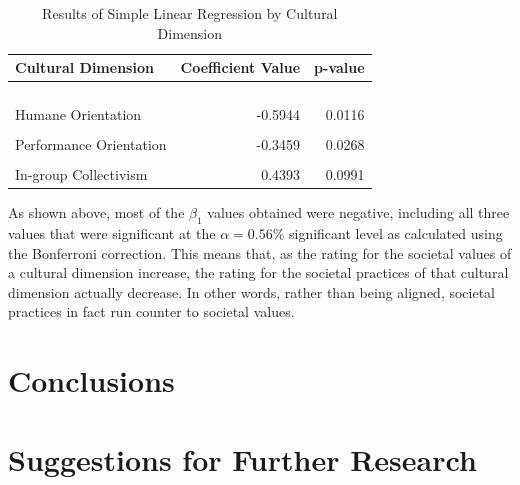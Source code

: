 \documentclass[
]{article}
\begin{document}
\begin{table}[!h]

\caption{\label{tab:SPV SLR Table}Results of Simple Linear Regression by Cultural Dimension}
\centering
\begin{tabular}[t]{lrr}
\toprule
Cultural Dimension & Coefficient Value & p-value\\
\midrule
\cellcolor[HTML]{E5F5E0}{Uncertainty Avoidance} & \cellcolor[HTML]{E5F5E0}{-0.6199} & \cellcolor[HTML]{E5F5E0}{0.0000}\\
\cellcolor[HTML]{E5F5E0}{Institutional Collectivism} & \cellcolor[HTML]{E5F5E0}{-0.5251} & \cellcolor[HTML]{E5F5E0}{0.0000}\\
\cellcolor[HTML]{E5F5E0}{Power Distance} & \cellcolor[HTML]{E5F5E0}{-0.4991} & \cellcolor[HTML]{E5F5E0}{0.0006}\\
\cellcolor[HTML]{E5F5E0}{Future Orientation} & \cellcolor[HTML]{E5F5E0}{-0.4725} & \cellcolor[HTML]{E5F5E0}{0.0009}\\
Humane Orientation & -0.5944 & 0.0116\\
\addlinespace
\cellcolor[HTML]{F0F0F0}{Gender Egalitarianism} & \cellcolor[HTML]{F0F0F0}{0.2437} & \cellcolor[HTML]{F0F0F0}{0.0124}\\
Performance Orientation & -0.3459 & 0.0268\\
\cellcolor[HTML]{F0F0F0}{Assertiveness} & \cellcolor[HTML]{F0F0F0}{-0.1507} & \cellcolor[HTML]{F0F0F0}{0.0414}\\
In-group Collectivism & 0.4393 & 0.0991\\
\bottomrule
\end{tabular}
\end{table}

As shown above, most of the \(\beta_1\) values obtained were negative,
including all three values that were significant at the
\(\alpha = 0.56\)\% significant level as calculated using the Bonferroni
correction. This means that, as the rating for the societal values of a
cultural dimension increase, the rating for the societal practices of
that cultural dimension actually decrease. In other words, rather than
being aligned, societal practices in fact run counter to societal
values.

\hypertarget{conclusions}{%
\section{Conclusions}\label{conclusions}}

\hypertarget{suggestions-for-further-research}{%
\section{Suggestions for Further
Research}\label{suggestions-for-further-research}}
\end{document}
